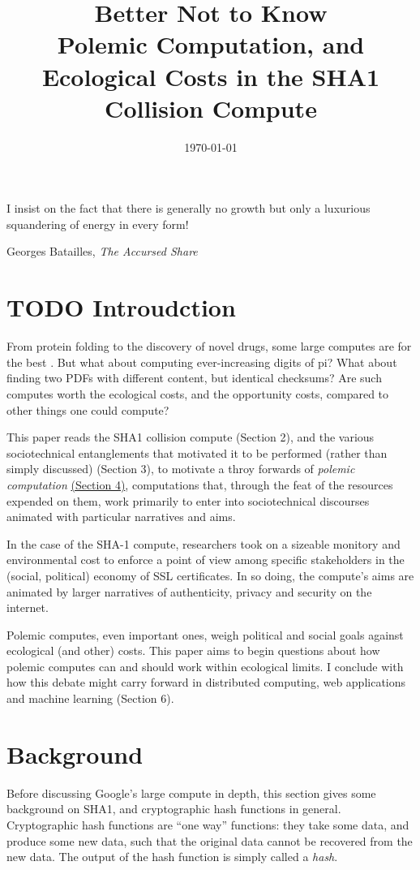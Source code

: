 \documentclass[sigconf]{acmart}
\date{\today}
\title{Better Not to Know\\\medskip
\large Polemic Computation, and Ecological Costs in the SHA1 Collision Compute}
\begin{document}
\maketitle

\epigraph{I insist on the fact that there is generally no growth but only a luxurious squandering of energy in every form!}{Georges Batailles, \textit{The Accursed Share}}

\section{{\bfseries\sffamily TODO} Introudction}
\label{sec:org0166ce6}

From protein folding to the discovery of novel drugs,
some large computes are for the best
\cite{Anderson2004}.
But what about computing ever-increasing digits of pi?
What about finding two PDFs with different content, but identical checksums?
Are such computes worth
the ecological costs, and the opportunity costs, compared to other things one could compute?

This paper reads the SHA1 collision compute (Section 2), and the various sociotechnical entanglements that motivated it to be performed (rather than simply discussed) (Section 3),
to motivate a throy forwards of \emph{polemic computation} \uline{(Section 4)}, 
computations that, through the feat of the resources expended on them, 
work primarily to enter into sociotechnical discourses animated with particular narratives and aims.

In the case of the SHA-1 compute, researchers took on a sizeable monitory and environmental cost
to enforce a point of view among specific stakeholders in the (social, political) economy of SSL certificates.
In so doing, the compute's aims are animated by
larger narratives of authenticity, privacy and security on the internet.

Polemic computes, even important ones, weigh political and social goals against ecological (and other) costs.
This paper aims to begin questions about how polemic computes can and should work within ecological limits.
I conclude with how this debate might carry forward in distributed computing, web applications and machine learning (Section 6).

\section{Background}
\label{sec:orgfb8d247}


Before discussing Google's large compute in depth,
this section gives some background on SHA1, and cryptographic hash functions in general.
Cryptographic hash functions are ``one way'' functions: 
they take some data, and produce some new data, such that the original data cannot be recovered from the new data. The output of the hash function is simply called a \emph{hash}.
\end{document}
